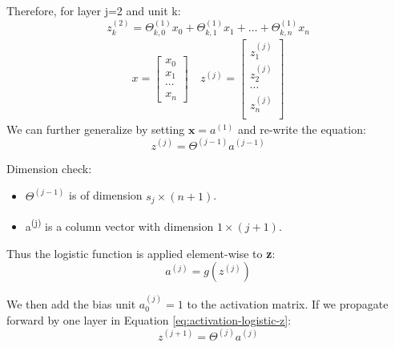                 Therefore, for layer j=2 and unit k:
                    \[
                        z_k^{(2)} = \Theta^{(1)}_{k, 0} x_0 + \Theta^{(1)}_{k, 1} x_1+ \dots+ \Theta^{(1)}_{k, n} x_n 
                    \]                
                \begin{align*}
                x = \begin{bmatrix}
                        x_0 \\
                        x_1 \\
                        \cdots \\
                        x_n
                    \end{bmatrix} \: &
                z^{(j)} = \begin{bmatrix}
                            z_1^{(j)} \\ 
                            z_2^{(j)} \\
                            \cdots \\
                            z_n^{(j)} \\
                          \end{bmatrix}
                \end{align*}
                We can further generalize by setting $\mathbf{x} = a^{(1)}$ and re-write the equation:
                \begin{equation}
                    z^{(j)} = \Theta^{(j-1)} a^{(j-1)}
                    \label{eq:activation-logistic-z}
                \end{equation}

                Dimension check:  
                \begin{itemize}
                    \item $\Theta^{(j-1)}$ is of dimension $s_j\times (n+1)$.
                    \item a\textsuperscript{(j)} is a column vector with dimension $1\times(j+1)$.
                \end{itemize}

                Thus the logistic function is applied element-wise to \textbf{z}: 
                \begin{equation}
                    a^{(j)} = g (z^{(j)})
                    \label{eq:activation}
                \end{equation}

                We then add the bias unit $a_0^{(j)} = 1$ to the activation matrix. If we propagate forward by one layer in Equation \ref{eq:activation-logistic-z}:
                \begin{equation}
                    z^{(j+1)} = \Theta^{(j)} a^{(j)}
                    \label{eq:formal-activation-x}
                \end{equation}

